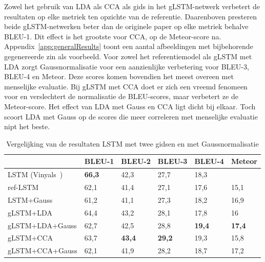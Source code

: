 Zowel het gebruik van LDA als CCA als gids in het gLSTM-netwerk verbetert de resultaten op elke metriek ten opzichte van de referentie. Daarenboven presteren beide gLSTM-netwerken beter dan de originele paper op elke metriek behalve BLEU-1. Dit effect is het grootste voor CCA, op de Meteor-score na. Appendix~\ref{app:generalResults} toont een aantal afbeeldingen met bijbehorende gegenereerde zin als voorbeeld. Voor zowel het referentiemodel als gLSTM met LDA zorgt Gaussnormalisatie voor een aanzienlijke verbetering voor BLEU-3, BLEU-4 en Meteor. Deze scores komen bovendien het meest overeen met menselijke evaluatie. Bij gLSTM met CCA doet er zich een vreemd fenomeen voor en verslechtert de normalisatie de BLEU-scores, maar verbetert ze de Meteor-score. 
Het effect van LDA met Gauss en CCA ligt dicht bij elkaar. Toch scoort LDA met Gauss op de scores die meer correleren met menselijke evaluatie nipt het beste.
    \begin{table}
    	\centering
    	\begin{tabular}{llllll}
    		~                   & BLEU-1 & BLEU-2 & BLEU-3 & BLEU-4 & Meteor \\ \hline
    		LSTM (Vinyals~\cite{Google})      & \textbf{66,3}   & 42,3   & 27,7   & 18,3   & ~     \\ 
    		ref-LSTM         & 62,1   & 41,4   & 27,1   & 17,6   & 15,1  \\
    		LSTM+Gauss        & 61,2   & 41,1   & 27,3   & 18,2   & 16,9  \\
    		gLSTM+LDA         & 64,4   & 43,2   & 28,1   & 17,8   & 16  \\
    		gLSTM+LDA+Gauss & 62,7   & 42,5   & 28,8   & \textbf{19,4}   & \textbf{17,4}  \\
	        gLSTM+CCA         & 63,7   & \textbf{43,4}   & \textbf{29,2}   &19,3   & 15,8  \\
	        gLSTM+CCA+Gauss & 62,1   & 41,9   & 28,2   & 18,7   & 17,2  \\\hline
    	\end{tabular}
   	\caption{Vergelijking van de resultaten LSTM met twee gidsen en met Gaussnormalisatie}	
   	\label{table:lstm_results}
    \end{table}

